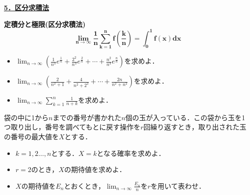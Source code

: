 \documentclass[a4paper,11pt]{ltjsarticle}
\begin{document}
\newpage
\noindent \underline{{\large{\textbf{5．区分求積法}}}}
\begin{rembox}
    \textbf{定積分と極限(区分求積法)}
    \[\boldsymbol{\lim_{n\to\infty}\frac{1}{n}\sum_{k=1}^nf\left(\frac kn\right)=\int_0^1 f(x)dx}\]
\end{rembox}
\begin{toi}
\begin{itemize}
    \item [(1)]$\displaystyle{\lim_{n\to\infty }\left(\frac{1}{n^3}e^{\frac{1}{n}}+\frac{2^2}{n^3}e^{\frac{2}{n}}+\cdots+\frac{n^2}{n^3}e^{\frac{n}{n}}\right)}$を求めよ．
     \item [(2)]$\displaystyle{\lim_{n\to\infty }\left(\frac{2}{n^2+1}+\frac{4}{n^2+2^2}+\cdots+\frac{2n}{n^2+n^2}\right)}$を求めよ．
          \item [(3)]$\displaystyle{\lim_{n\to\infty }\sum_{k=1}^n\frac{1}{n+k}}$を求めよ．
\end{itemize}
\end{toi}

\begin{toi}
袋の中に1から$n$までの番号が書かれた$n$個の玉が入っている．この袋から玉を1つ取り出し，番号を調べてもとに戻す操作を$r$回繰り返すとき，取り出された玉の番号の最大値を$X$とする．
\begin{itemize}
    \item [(1)]$k=1,2\ldots,n$とする．$X=k$となる確率を求めよ．
    \item [(2)]$r=2$のとき，$X$の期待値を求めよ．
    \item [(3)]$X$の期待値を$E_n$とおくとき，$\displaystyle{\lim_{n\to\infty}\frac{E_n}{n}}$を$r$を用いて表わせ．
\end{itemize}
\end{toi}
\end{document}
